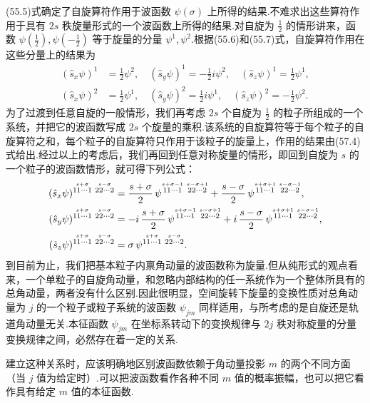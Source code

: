 (55.5)式确定了自旋算符作用于波函数 $\psi(\sigma)$ 上所得的结果.不难求出这些算符作用于具有 $2s$ 秩旋量形式的一个波函数上所得的结果.对自旋为 $\frac{1}{2}$ 的情形讲来，函数 $\psi\left(\frac{1}{2}\right),\psi\left(-\frac{1}{2}\right)$ 等于旋量的分量 $\psi^1,\psi^2$.根据(55.6)和(55.7)式，自旋算符作用在这些分量上的结果为
\begin{equation}
\begin{aligned}
  (\hat{s}_x\psi)^1&=\frac{1}{2}\psi^2,\quad
  (\hat{s}_y\psi)^1=-\frac{1}{2}i\psi^2,\quad
  (\hat{s}_z\psi)^1=\frac{1}{2}\psi^1,\\
  (\hat{s}_x\psi)^2&=\frac{1}{2}\psi^1,\quad
  (\hat{s}_y\psi)^2=\frac{1}{2}i\psi^1,\quad
  (\hat{s}_z\psi)^2=-\frac{1}{2}\psi^2.
\end{aligned}
\end{equation}
为了过渡到任意自旋的一般情形，我们再考虑 $2s$ 个自旋为 $\frac{1}{2}$ 的粒子所组成的一个系统，并把它的波函数写成 $2s$ 个旋量的乘积.该系统的自旋算符等于每个粒子的自旋算符之和，每个粒子的自旋算符只作用于该粒子的旋量上，作用的结果由(57.4)式给出.经过以上的考虑后，我们再回到任意对称旋量的情形，即回到自旋为 $s$ 的一个粒子的波函数情形，就可得下列公式：
\begin{align}
  (\hat{s}_x\psi)^{\overset{s+\sigma}{11\cdots1}\ \overset{s-\sigma}{22\cdots2}}
  &=\frac{s+\sigma}{2}\,
  \psi^{\overset{s+\sigma-1}{11\cdots1}\ \overset{s-\sigma+1}{22\cdots2}}
  +\frac{s-\sigma}{2}\,
  \psi^{\overset{s+\sigma+1}{11\cdots1}\ \overset{s-\sigma-1}{22\cdots2}},\notag\\
  (\hat{s}_y\psi)^{\overset{s+\sigma}{11\cdots1}\ \overset{s-\sigma}{22\cdots2}}
  &=-i\,\frac{s+\sigma}{2}\,
  \psi^{\overset{s+\sigma-1}{11\cdots1}\ \overset{s-\sigma+1}{22\cdots2}}
  +i\,\frac{s-\sigma}{2}\,
  \psi^{\overset{s+\sigma+1}{11\cdots1}\ \overset{s-\sigma-1}{22\cdots2}},\notag\\
  (\hat{s}_z\psi)^{\overset{s+\sigma}{11\cdots1}\ \overset{s-\sigma}{22\cdots2}}
  &=\sigma\,\psi^{\overset{s+\sigma}{11\cdots1}\ \overset{s-\sigma}{22\cdots2}}.
\end{align}
到目前为止，我们把基本粒子内禀角动量的波函数称为旋量.但从纯形式的观点看来，一个单粒子的自旋角动量，和忽略内部结构的任一系统作为一个整体所具有的总角动量，两者没有什么区别.因此很明显，空间旋转下旋量的变换性质对总角动量为 $j$ 的一个粒子或粒子系统的波函数 $\psi_{jm}$ 同样适用，与所考虑的是自旋还是轨道角动量无关.本征函数 $\psi_{jm}$ 在坐标系转动下的变换规律与 $2j$ 秩对称旋量的分量变换规律之间，必然存在着一定的关系.

建立这种关系时，应该明确地区别波函数依赖于角动量投影 $m$ 的两个不同方面（当 $j$ 值为给定时）.可以把波函数看作各种不同 $m$ 值的概率振幅，也可以把它看作具有给定 $m$ 值的本征函数.

